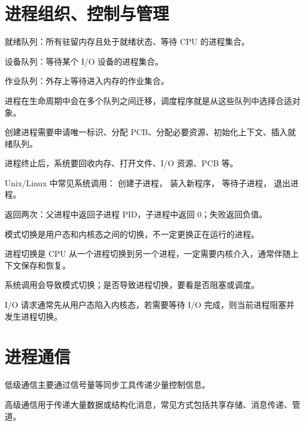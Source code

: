 \section{进程组织、控制与管理}
\begin{points}
  \item 就绪队列：所有驻留内存且处于就绪状态、等待 CPU 的进程集合。
  \item 设备队列：等待某个 I/O 设备的进程集合。
  \item 作业队列：外存上等待进入内存的作业集合。
  \item 进程在生命周期中会在多个队列之间迁移，调度程序就是从这些队列中选择合适对象。
\end{points}


\begin{points}
  \item 创建进程需要申请唯一标识、分配 PCB、分配必要资源、初始化上下文、插入就绪队列。
  \item 进程终止后，系统要回收内存、打开文件、I/O 资源、PCB 等。
  \item Unix/Linux 中常见系统调用： 创建子进程， 装入新程序， 等待子进程， 退出进程。
  \item {} 返回两次：父进程中返回子进程 PID，子进程中返回 0；失败返回负值。
\end{points}


\begin{points}
  \item 模式切换是用户态和内核态之间的切换，不一定更换正在运行的进程。
  \item 进程切换是 CPU 从一个进程切换到另一个进程，一定需要内核介入，通常伴随上下文保存和恢复。
  \item 系统调用会导致模式切换；是否导致进程切换，要看是否阻塞或调度。
  \item I/O 请求通常先从用户态陷入内核态，若需要等待 I/O 完成，则当前进程阻塞并发生进程切换。
\end{points}


\section{进程通信}
\begin{points}
  \item 低级通信主要通过信号量等同步工具传递少量控制信息。
  \item 高级通信用于传递大量数据或结构化消息，常见方式包括共享存储、消息传递、管道。
\end{points}


